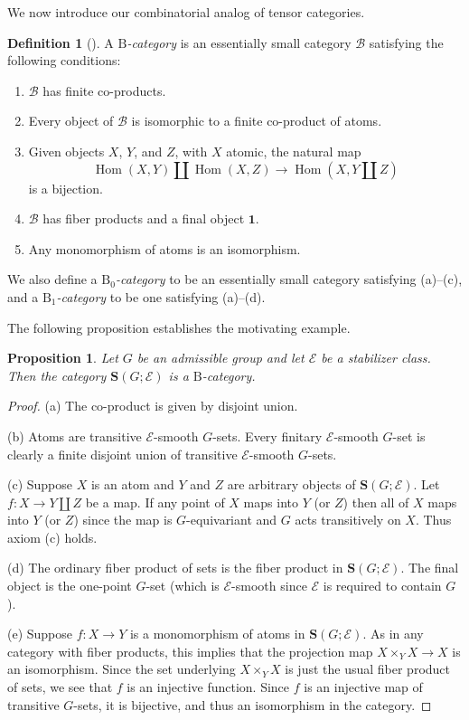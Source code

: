 \documentclass[12pt]{amsart}
\numberwithin{equation}{section}
\newtheorem{proposition}[equation]{Proposition}
\theoremstyle{definition}
\newtheorem{defnaux}[equation]{Definition}
\newenvironment{definition}[1][]{\begin{defnaux}[#1]\pushQED{\qed}}{\popQED \end{defnaux}}
\newcommand{\cB}{\mathcal{B}}
\newcommand{\rB}{\mathrm{B}}
\newcommand{\sE}{\mathscr{E}}
\newcommand{\bS}{\mathbf{S}}
\newcommand{\defn}[1]{\emph{#1}}
\DeclareMathOperator{\Hom}{Hom}
\newcommand{\bone}{\mathbf{1}}
\begin{document}
We now introduce our combinatorial analog of tensor categories.

\begin{definition} \label{defn:B}
A \defn{$\rB$-category} is an essentially small category $\cB$ satisfying the following conditions:
\begin{enumerate}
\item $\cB$ has finite co-products.
\item Every object of $\cB$ is isomorphic to a finite co-product of atoms.
\item Given objects $X$, $Y$, and $Z$, with $X$ atomic, the natural map
\begin{displaymath}
\Hom(X, Y) \amalg \Hom(X, Z) \to \Hom(X, Y \amalg Z)
\end{displaymath}
is a bijection.
\item $\cB$ has fiber products and a final object $\bone$.
\item Any monomorphism of atoms is an isomorphism.
\end{enumerate}
We also define a \defn{$\rB_0$-category} to be an essentially small category satisfying (a)--(c), and a \defn{$\rB_1$-category} to be one satisfying (a)--(d).
\end{definition}

The following proposition establishes the motivating example.

\begin{proposition}
Let $G$ be an admissible group and let $\sE$ be a stabilizer class. Then the category $\bS(G; \sE)$ is a $\rB$-category.
\end{proposition}

\begin{proof}
(a) The co-product is given by disjoint union.

(b) Atoms are transitive $\sE$-smooth $G$-sets. Every finitary $\sE$-smooth $G$-set is clearly a finite disjoint union of transitive $\sE$-smooth $G$-sets.

(c) Suppose $X$ is an atom and $Y$ and $Z$ are arbitrary objects of $\bS(G; \sE)$. Let $f \colon X \to Y \amalg Z$ be a map. If any point of $X$ maps into $Y$ (or $Z$) then all of $X$ maps into $Y$ (or $Z$) since the map is $G$-equivariant and $G$ acts transitively on $X$. Thus axiom (c) holds.

(d) The ordinary fiber product of sets is the fiber product in $\bS(G; \sE)$. The final object is the one-point $G$-set (which is $\sE$-smooth since $\sE$ is required to contain $G$).

(e) Suppose $f \colon X \to Y$ is a monomorphism of atoms in $\bS(G; \sE)$. As in any category with fiber products, this implies that the projection map $X \times_Y X \to X$ is an isomorphism. Since the set underlying $X \times_Y X$ is just the usual fiber product of sets, we see that $f$ is an injective function. Since $f$ is an injective map of transitive $G$-sets, it is bijective, and thus an isomorphism in the category.
\end{proof}
\end{document}
